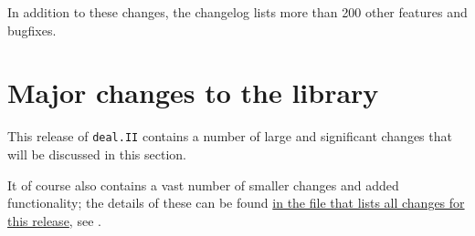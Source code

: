 \documentclass{ansarticle-preprint}
\newcommand{\specialword}[1]{\texttt{#1}}
\newcommand{\dealii}{{\specialword{deal.II}}\xspace}
\begin{document}
\begin{itemize}
%
%
\end{itemize}
%
In addition to these changes, the changelog lists more than 200 other
features and bugfixes.




\section{Major changes to the library}
\label{sec:major}

This release of \dealii contains a number of large and significant changes
that will be discussed in this section.

It of course also contains a
vast number of smaller changes and added functionality; the details of these
can be found
\href{https://dealii.org/developer/doxygen/deal.II/changes_between_9_0_1_and_9_1_0.html}{
in the file that lists all changes for this release}, see \cite{changes91}.
\end{document}
